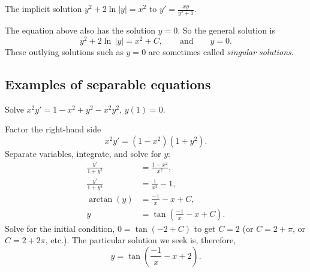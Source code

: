 \begin{myfig}
\capstart
{}
\caption{The implicit solution $y^2+2\ln|y|=x^2$ to $y'=\frac{xy}{y^2+1}$.\label{implicitsols:fig}}
\end{myfig}


The equation above also has the solution $y=0$.
So the general solution is 
\begin{equation*}
y^2 + 2 \ln \, \lvert y \rvert = x^2 + C, \qquad \text{and} \qquad y=0.
\end{equation*}
These outlying solutions
such as $y=0$
are sometimes called \emph{singular solutions}.

\subsection{Examples of separable equations}

\begin{example}
Solve $x^2y' = 1 - x^2+y^2 - x^2y^2$, $y(1) = 0$.

Factor the right-hand side
\begin{equation*}
x^2y' = (1 - x^2)(1+y^2) .
\end{equation*}
Separate variables, integrate, and solve for $y$:
\begin{align*}
\frac{y'}{1+y^2} & = \frac{1 - x^2}{x^2} , \\
\frac{y'}{1+y^2} & = \frac{1}{x^2} - 1 , \\
\operatorname{arctan} (y) & = \frac{-1}{x} - x + C , \\
y & = \tan \left(\frac{-1}{x} - x + C\right) .
\end{align*}
Solve for the initial condition, $0 = \tan(-2+C)$ to get $C=2$ (or $C = 2 +
\pi$, or $C = 2 + 2\pi$, etc.).  The particular solution we seek is, therefore,
\begin{equation*}
y = \tan \left(\frac{-1}{x} - x + 2 \right) .
\end{equation*}
\end{example}

